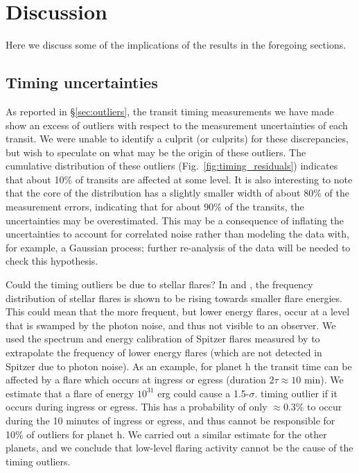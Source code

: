 \documentclass[fleqn,usenatbib]{mnras} %
\begin{document}
\section{Discussion} \label{sec:discussion}

Here we discuss some of the implications of the results in the foregoing sections.

\subsection{Timing uncertainties}

As reported in \S \ref{sec:outliers}, the transit timing measurements we have made show an excess of outliers with respect to the measurement uncertainties of each transit.  We were unable to identify a culprit (or culprits) for these discrepancies, but wish to speculate on what may be the origin of these outliers.  The cumulative distribution of these outliers (Fig.\ \ref{fig:timing_residuals}) indicates that about 10\% of transits
are affected at some level.  It is also interesting to note that the core of the distribution has a slightly smaller width of about 80\% of the measurement errors, indicating that for about 90\% of the transits, the uncertainties may be overestimated.  This may be a consequence of inflating the uncertainties to account for correlated noise rather than modeling the data with, for example, a Gaussian process;  further re-analysis of the data will be needed to check this hypothesis.

Could the timing outliers be due to stellar flares?  In \citet{Vida_2017} and \citet{Ducrot2020}, the frequency distribution of stellar flares is shown to be rising towards smaller flare energies.  This could mean that the more frequent, but lower energy flares, occur at a level that is swamped by the photon noise, and thus not visible to an observer.  We used the spectrum and energy calibration of Spitzer flares measured by \citet{Ducrot2020} to extrapolate the frequency of lower energy flares (which are not detected in Spitzer due to photon noise).  As an example, for planet h the transit time can be affected by a flare which occurs at ingress or egress (duration $2\tau \approx 10$ min).  %
We estimate that a flare of energy $10^{31}$ erg could cause a 1.5-$\sigma$.
timing outlier if it occurs during ingress or egress.  This has a probability of only $\approx 0.3$\% to occur during the 10 minutes of ingress or egress,
and thus cannot be responsible for 10\% of outliers for planet h.  We carried out a similar estimate for
the other planets, and we conclude that low-level flaring activity cannot be the cause of the timing outliers.
\end{document}
